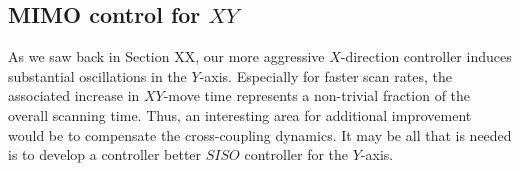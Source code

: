\documentclass[11pt]{article}
\begin{document}
\subsection{MIMO control for $XY$}
As we saw back in Section XX, our more aggressive $X$-direction controller induces substantial oscillations in the $Y$-axis. Especially for faster scan rates, the associated increase in $XY$-move time represents a non-trivial fraction of the overall scanning time. Thus, an interesting area for additional improvement would be to compensate the cross-coupling dynamics. It may be all that is needed is to develop a controller better $SISO$ controller for the $Y$-axis.




\end{document}
